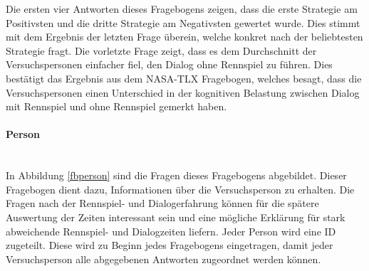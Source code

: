 \documentclass[12pt,a4paper]{scrartcl}
\begin{document}
Die ersten vier Antworten dieses Fragebogens zeigen, dass die erste Strategie am Positivsten und die dritte Strategie am Negativsten gewertet wurde. Dies stimmt mit dem Ergebnis der letzten Frage überein, welche konkret nach der beliebtesten Strategie fragt. \newline \newline Die vorletzte Frage zeigt, dass es dem Durchschnitt der Versuchspersonen einfacher fiel, den Dialog ohne Rennspiel zu führen. Dies bestätigt das Ergebnis aus dem NASA-TLX Fragebogen, welches besagt, dass die Versuchspersonen einen Unterschied in der kognitiven Belastung zwischen Dialog mit Rennspiel und ohne Rennspiel gemerkt haben.  

\paragraph{Person}
\label{fbperson1}
~\\
In Abbildung \ref{fbperson} sind die Fragen dieses Fragebogens abgebildet. Dieser Fragebogen dient dazu, Informationen über die Versuchsperson zu erhalten.
Die Fragen nach der Rennspiel- und Dialogerfahrung können für die spätere Auswertung der Zeiten interessant sein und eine mögliche Erklärung für stark abweichende Rennspiel- und Dialogzeiten liefern. \newline \newline
Jeder Person wird eine ID zugeteilt. Diese wird zu Beginn jedes Fragebogens eingetragen, damit jeder Versuchsperson alle abgegebenen Antworten zugeordnet werden können. 
\end{document}
